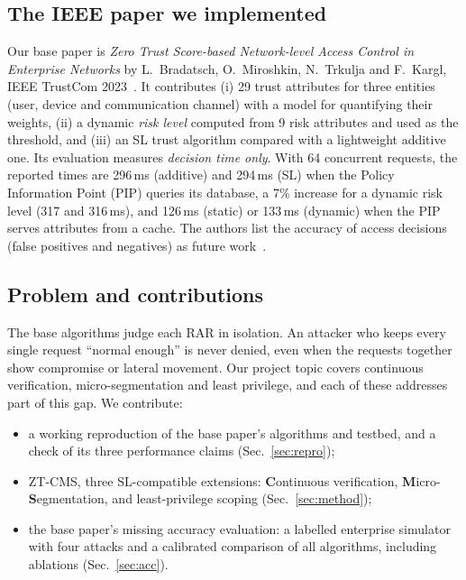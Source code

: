 \documentclass[conference,a4paper]{IEEEtran}
\begin{document}
\subsection{The IEEE paper we implemented}
Our base paper is \emph{Zero Trust Score-based Network-level Access Control in Enterprise Networks} by L.~Bradatsch, O.~Miroshkin, N.~Trkulja and F.~Kargl, IEEE TrustCom 2023~\cite{base}. It contributes (i) 29 trust attributes for three entities (user, device and communication channel) with a model for quantifying their weights, (ii) a dynamic \emph{risk level} computed from 9 risk attributes and used as the threshold, and (iii) an SL trust algorithm compared with a lightweight additive one. Its evaluation measures \emph{decision time only}. With 64 concurrent requests, the reported times are 296\,ms (additive) and 294\,ms (SL) when the Policy Information Point (PIP) queries its database, a 7\% increase for a dynamic risk level (317 and 316\,ms), and 126\,ms (static) or 133\,ms (dynamic) when the PIP serves attributes from a cache. The authors list the accuracy of access decisions (false positives and negatives) as future work~\cite{base}.

\subsection{Problem and contributions}
The base algorithms judge each RAR in isolation. An attacker who keeps every single request ``normal enough'' is never denied, even when the requests together show compromise or lateral movement. Our project topic covers continuous verification, micro-segmentation and least privilege, and each of these addresses part of this gap. We contribute:
\begin{itemize}
\item a working reproduction of the base paper's algorithms and testbed, and a check of its three performance claims (Sec.~\ref{sec:repro});
\item ZT-CMS, three SL-compatible extensions: \textbf{C}ontinuous verification, \textbf{M}icro-\textbf{S}egmentation, and least-privilege scoping (Sec.~\ref{sec:method});
\item the base paper's missing accuracy evaluation: a labelled enterprise simulator with four attacks and a calibrated comparison of all algorithms, including ablations (Sec.~\ref{sec:acc}).
\end{itemize}
\end{document}

